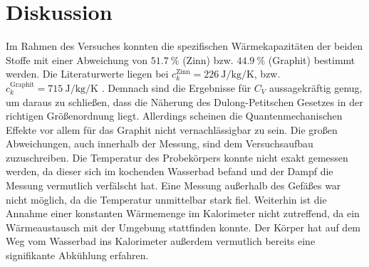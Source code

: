 \section{Diskussion}
\label{sec:Diskussion}

Im Rahmen des Versuches konnten die spezifischen Wärmekapazitäten der beiden Stoffe mit einer Abweichung von $\SI{51.7}{\%}$ (Zinn) bzw. $\SI{44.9}{\%}$ (Graphit) bestimmt werden. Die Literaturwerte liegen bei $c_k^\text{Zinn} = \SI{226}{\joule\per\kilogram\per\kelvin}$, bzw. $c_k^\text{Graphit} = \SI{715}{\joule\per\kilogram\per\kelvin}$ \cite{wärmeatlas}. Demnach sind die Ergebnisse für $C_V$ aussagekräftig genug, um daraus zu schließen, dass die Näherung des Dulong-Petitschen Gesetzes in der richtigen Größenordnung liegt. Allerdings scheinen die Quantenmechanischen Effekte vor allem für das Graphit nicht vernachlässigbar zu sein. Die großen Abweichungen, auch innerhalb der Messung, sind dem Versuchsaufbau zuzuschreiben. Die Temperatur des Probekörpers konnte nicht exakt gemessen werden, da dieser sich im kochenden Wasserbad befand und der Dampf die Messung vermutlich verfälscht hat. Eine Messung außerhalb des Gefäßes war nicht möglich, da die Temperatur unmittelbar stark fiel. Weiterhin ist die Annahme einer konstanten Wärmemenge im Kalorimeter nicht zutreffend, da ein Wärmeaustausch mit der Umgebung stattfinden konnte. Der Körper hat auf dem Weg vom Wasserbad ins Kalorimeter außerdem vermutlich bereits eine signifikante Abkühlung erfahren. 
